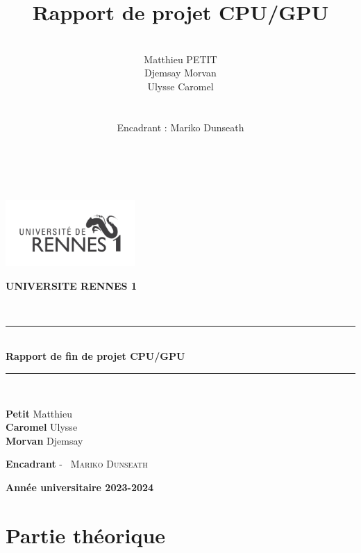 \documentclass[10pt,a4paper]{article}
\title{Rapport de projet CPU/GPU}
\author{\\Matthieu PETIT\\Djemsay Morvan\\Ulysse Caromel\\\\\\
Encadrant : Mariko Dunseath\\\\\\}
\begin{document}



\begin{titlepage}

    \begin{center}
        \begin{center}
            \includegraphics[height=2.5cm]{../Images/univ-rennes1.png}
            
        \end{center}
        \begin{center}
            \textbf{UNIVERSITE RENNES 1 }
        \end{center}
        \textsc{\Large }\\[2.5cm]
    \rule{\linewidth}{0.3mm} \\[0.4cm]
    { \huge \bfseries Rapport de fin de projet CPU/GPU \\[0.4cm] }
    \rule{\linewidth}{0.3mm} \\[3cm]
    
    
    \noindent
    \begin{center}
        \textbf{Petit} Matthieu\\
        \textbf{Caromel} Ulysse\\
        \textbf{Morvan} Djemsay\\
    \end{center}
        
    \color{black}
    \centering
    \large \textbf{Encadrant} - ~\textsc{Mariko Dunseath} 
    
    \vfill
    
    {\textbf{\large {Année universitaire} 2023-2024}}
    
    \end{center}
\end{titlepage}

\newpage

\tableofcontents

\newpage

\section{Partie théorique}
\end{document}
